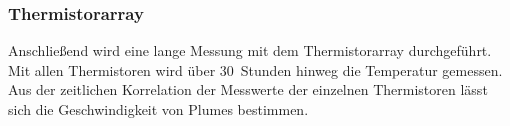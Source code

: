\subsubsection{Thermistorarray}
Anschließend wird eine lange Messung mit dem Thermistorarray durchgeführt.
Mit allen Thermistoren wird über 30~Stunden hinweg die Temperatur gemessen.
Aus der zeitlichen Korrelation der Messwerte der einzelnen Thermistoren lässt sich die Geschwindigkeit von Plumes bestimmen.

